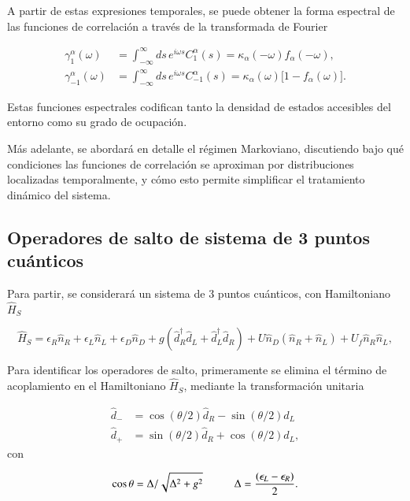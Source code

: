 \begin{appendixs}
A partir de estas expresiones temporales, se puede obtener la forma espectral de las funciones de correlación a través de la transformada de Fourier

\begin{align*}
    \gamma_{1}^{\alpha}(\omega) &= \int_{-\infty}^{\infty} ds\, e^{i \omega s} C_{1}^{\alpha}(s) = \kappa_{\alpha}(-\omega) f_{\alpha}(-\omega), \\
    \gamma_{-1}^{\alpha}(\omega) &= \int_{-\infty}^{\infty} ds\, e^{i \omega s} C_{-1}^{\alpha}(s) = \kappa_{\alpha}(\omega)\big[1 - f_{\alpha}(\omega)\big].
\end{align*}

Estas funciones espectrales codifican tanto la densidad de estados accesibles del entorno como su grado de ocupación.

Más adelante, se abordará en detalle el régimen Markoviano, discutiendo bajo qué condiciones las funciones de correlación se aproximan por distribuciones localizadas temporalmente, y cómo esto permite simplificar el tratamiento dinámico del sistema.

\label{apendix5bathcorre}

\subsection{ Operadores de salto de sistema de 3 puntos cuánticos}
Para partir, se considerará un sistema de 3 puntos cuánticos, con Hamiltoniano $\hat{H}_{S}$

\begin{equation*}
    \hat{H}_{S} = \epsilon_{R}\hat{n}_{R} + \epsilon_{L}\hat{n}_{L} + \epsilon_{D}\hat{n}_{D}  + g(\hat{d}^{\dagger}_{R}\hat{d}_{L} + \hat{d}^{\dagger}_{L}\hat{d}_{R}) + U \hat{n}_{D}(\hat{n}_{R} + \hat{n}_{L}) + U_{f}\hat{n}_{R}\hat{n}_{L},
\end{equation*}

Para identificar los operadores de salto, primeramente se elimina el término de acoplamiento en el Hamiltoniano $\hat{H}_{S}$, mediante la transformación unitaria

\begin{align*}
    \hat{d}_{-} & = \cos(\theta/2)\hat{d}_{R} - \sin(\theta/2)\hat{d}_{L} \\
    \hat{d}_{+} & = \sin(\theta/2)\hat{d}_{R} + \cos(\theta/2)\hat{d}_{L},
\end{align*}
con 

\begin{equation*}
    \cos \theta = \Delta/\sqrt{ \Delta^{2} + g^{2} } \hspace{10mm} \Delta = \frac{(\epsilon_{L}-\epsilon_{R})}{2}.
\end{equation*}


\end{appendixs}
